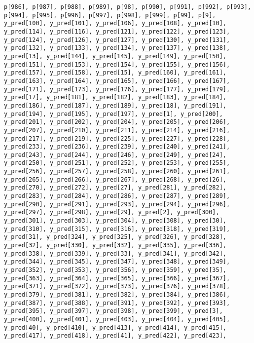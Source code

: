 \documentclass[
  letterpaper,
  DIV=11,
  numbers=noendperiod]{scrartcl}
\begin{document}
\begin{verbatim}
p[986], p[987], p[988], p[989], p[98], p[990], p[991], p[992], p[993],
p[994], p[995], p[996], p[997], p[998], p[999], p[99], p[9],
y_pred[100], y_pred[101], y_pred[106], y_pred[108], y_pred[10],
y_pred[114], y_pred[116], y_pred[121], y_pred[122], y_pred[123],
y_pred[124], y_pred[126], y_pred[127], y_pred[130], y_pred[131],
y_pred[132], y_pred[133], y_pred[134], y_pred[137], y_pred[138],
y_pred[13], y_pred[144], y_pred[145], y_pred[149], y_pred[150],
y_pred[151], y_pred[153], y_pred[154], y_pred[155], y_pred[156],
y_pred[157], y_pred[158], y_pred[15], y_pred[160], y_pred[161],
y_pred[163], y_pred[164], y_pred[165], y_pred[166], y_pred[167],
y_pred[171], y_pred[173], y_pred[176], y_pred[177], y_pred[179],
y_pred[17], y_pred[181], y_pred[182], y_pred[183], y_pred[184],
y_pred[186], y_pred[187], y_pred[189], y_pred[18], y_pred[191],
y_pred[194], y_pred[195], y_pred[197], y_pred[1], y_pred[200],
y_pred[201], y_pred[202], y_pred[204], y_pred[205], y_pred[206],
y_pred[207], y_pred[210], y_pred[211], y_pred[214], y_pred[216],
y_pred[217], y_pred[219], y_pred[225], y_pred[227], y_pred[228],
y_pred[233], y_pred[236], y_pred[239], y_pred[240], y_pred[241],
y_pred[243], y_pred[244], y_pred[246], y_pred[249], y_pred[24],
y_pred[250], y_pred[251], y_pred[252], y_pred[253], y_pred[255],
y_pred[256], y_pred[257], y_pred[258], y_pred[260], y_pred[261],
y_pred[265], y_pred[266], y_pred[267], y_pred[268], y_pred[26],
y_pred[270], y_pred[272], y_pred[27], y_pred[281], y_pred[282],
y_pred[283], y_pred[284], y_pred[286], y_pred[287], y_pred[289],
y_pred[290], y_pred[291], y_pred[293], y_pred[294], y_pred[296],
y_pred[297], y_pred[298], y_pred[29], y_pred[2], y_pred[300],
y_pred[301], y_pred[303], y_pred[304], y_pred[308], y_pred[30],
y_pred[310], y_pred[315], y_pred[316], y_pred[318], y_pred[319],
y_pred[31], y_pred[324], y_pred[325], y_pred[326], y_pred[328],
y_pred[32], y_pred[330], y_pred[332], y_pred[335], y_pred[336],
y_pred[338], y_pred[339], y_pred[33], y_pred[341], y_pred[342],
y_pred[344], y_pred[345], y_pred[347], y_pred[348], y_pred[349],
y_pred[352], y_pred[353], y_pred[356], y_pred[359], y_pred[35],
y_pred[363], y_pred[364], y_pred[365], y_pred[366], y_pred[367],
y_pred[371], y_pred[372], y_pred[373], y_pred[376], y_pred[378],
y_pred[379], y_pred[381], y_pred[382], y_pred[384], y_pred[386],
y_pred[387], y_pred[388], y_pred[391], y_pred[392], y_pred[393],
y_pred[395], y_pred[397], y_pred[398], y_pred[399], y_pred[3],
y_pred[400], y_pred[401], y_pred[403], y_pred[404], y_pred[405],
y_pred[40], y_pred[410], y_pred[413], y_pred[414], y_pred[415],
y_pred[417], y_pred[418], y_pred[41], y_pred[422], y_pred[423],

\end{verbatim}
\end{document}
